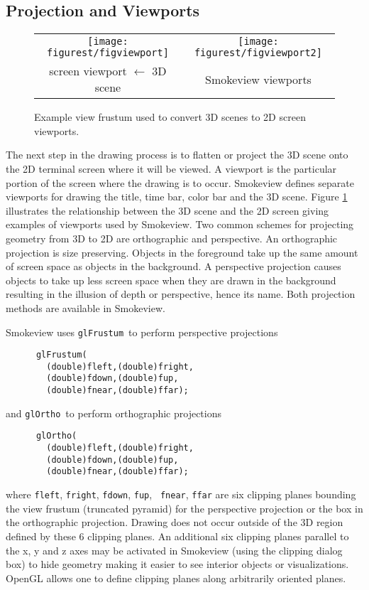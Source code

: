 \subsection{Projection and Viewports}
\begin{figure}[t]
\begin{center}
\begin{tabular}{cc}
\texttt{[image: figurest/figviewport]}&
\texttt{[image: figurest/figviewport2]}\\
screen viewport $\leftarrow$ 3D scene&
Smokeview viewports\\
\end{tabular}
\end{center}
\caption{Example view frustum used to convert 3D scenes to 2D
screen viewports.}
 \label{figviewports}
\end{figure}
The next step in the drawing process is to flatten or project the
3D scene onto the 2D terminal screen where it will be viewed. A
viewport is the particular portion of the screen where the drawing
is to occur.  Smokeview defines separate viewports for drawing the
title, time bar, color bar and the 3D scene.  Figure
\ref{figviewports} illustrates the relationship between the 3D
scene and the 2D screen giving examples of viewports used by
Smokeview. Two common schemes for projecting geometry from 3D to
2D  are orthographic and perspective. An orthographic projection
is size preserving. Objects in the foreground take up the same
amount of screen space as objects in the background. A perspective
projection causes objects to take up less screen space when they
are drawn in the background resulting in the illusion of depth or
perspective, hence its name. Both projection methods are available
in Smokeview.

Smokeview uses {\tt glFrustum}\ to perform perspective projections
\begin{verbatim}
      glFrustum(
        (double)fleft,(double)fright,
        (double)fdown,(double)fup,
        (double)fnear,(double)ffar);
\end{verbatim}
and {\tt glOrtho}\ to perform orthographic projections
\begin{verbatim}
      glOrtho(
        (double)fleft,(double)fright,
        (double)fdown,(double)fup,
        (double)fnear,(double)ffar);
\end{verbatim}

where {\tt fleft}, {\tt fright}, {\tt fdown}, {\tt fup}, {\tt
fnear}, {\tt ffar} are six clipping planes bounding the view
frustum (truncated pyramid) for the perspective projection or the
box in the orthographic projection.  Drawing does not occur
outside of the 3D region defined by these 6 clipping planes. An
additional six clipping planes parallel to the x, y and z axes may
be activated in Smokeview (using the clipping dialog box) to hide
geometry making it easier to see interior objects or
visualizations.  OpenGL allows one to define clipping planes along
arbitrarily oriented planes.




